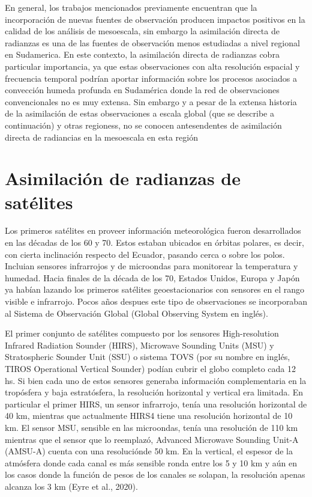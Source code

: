 \documentclass[12pt,oneside,a4paper]{reedthesis}
\begin{document}
En general, los trabajos mencionados previamente encuentran que la incorporación de nuevas fuentes de observación producen impactos positivos en la calidad de los análisis de mesoescala, sin embargo la asimilación directa de radianzas es una de las fuentes de observación menos estudiadas a nivel regional en Sudamerica. En este contexto, la asimilación directa de radianzas cobra particular importancia, ya que estas observaciones con alta resolución espacial y frecuencia temporal podrían aportar información sobre los procesos asociados a convección humeda profunda en Sudamérica donde la red de observaciones convencionales no es muy extensa. Sin embargo y a pesar de la extensa historia de la asimilación de estas observaciones a escala global (que se describe a continuación) y otras regioness, no se conocen antesendentes de asimilación directa de radiancias en la mesoescala en esta región

\hypertarget{asim-rad}{%
\section{Asimilación de radianzas de satélites}\label{asim-rad}}

Los primeros satélites en proveer información meteorológica fueron desarrollados en las décadas de los 60 y 70. Estos estaban ubicados en órbitas polares, es decir, con cierta inclinación respecto del Ecuador, pasando cerca o sobre los polos. Incluian sensores infrarrojos y de microondas para monitorear la temperatura y humedad. Hacia finales de la década de los 70, Estados Unidos, Europa y Japón ya habían lazando los primeros satélites geoestacionarios con sensores en el rango visible e infrarrojo. Pocos años despues este tipo de observaciones se incorporaban al Sistema de Observación Global (Global Observing System en inglés).

El primer conjunto de satélites compuesto por los sensores High-resolution Infrared Radiation Sounder (HIRS), Microwave Sounding Units (MSU) y Stratospheric Sounder Unit (SSU) o sistema TOVS (por su nombre en inglés, TIROS Operational Vertical Sounder) podían cubrir el globo completo cada 12 hs. Si bien cada uno de estos sensores generaba información complementaria en la tropósfera y baja estratósfera, la resolución horizontal y vertical era limitada. En particular el primer HIRS, un sensor infrarrojo, tenía una resolución horizontal de 40 km, mientras que actualmente HIRS4 tiene una resolución horizontal de 10 km. El sensor MSU, sensible en las microondas, tenía una resolución de 110 km mientras que el sensor que lo reemplazó, Advanced Microwave Sounding Unit-A (AMSU-A) cuenta con una resoluciónde 50 km. En la vertical, el espesor de la atmósfera donde cada canal es más sensible ronda entre los 5 y 10 km y aún en los casos donde la función de pesos de los canales se solapan, la resolución apenas alcanza los 3 km (Eyre et al., 2020).
\end{document}
